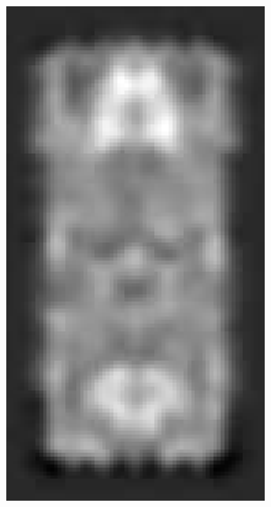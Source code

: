 \documentclass[thesis.tex]{subfiles}
\begin{document}
\begin{figure}
\begin{subfigure}[t]{0.13\textwidth}
		\caption{}
		\vspace{2mm}
	\end{subfigure}
	\begin{subfigure}[t]{0.135\textwidth}
		\includegraphics[width=\textwidth]{img/inriaExampleDescriptorSvmMax.pdf}
		\caption{}
		\vspace{2mm}
	\end{subfigure}

\end{figure}
\end{document}
